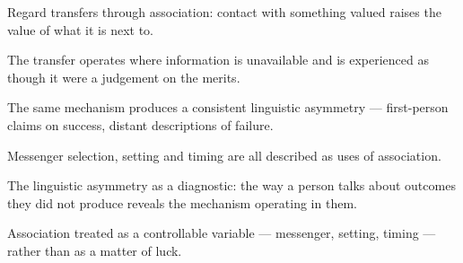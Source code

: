 

\begin{distilled}
  \item Regard transfers through association: contact with something valued raises the value of what it is next to.
  \item The transfer operates where information is unavailable and is experienced as though it were a judgement on the merits.
  \item The same mechanism produces a consistent linguistic asymmetry --- first-person claims on success, distant descriptions of failure.
  \item Messenger selection, setting and timing are all described as uses of association.
\end{distilled}

\begin{unique}
  \item The linguistic asymmetry as a diagnostic: the way a person talks about outcomes they did not produce reveals the mechanism operating in them.
  \item Association treated as a controllable variable --- messenger, setting, timing --- rather than as a matter of luck.
\end{unique}
